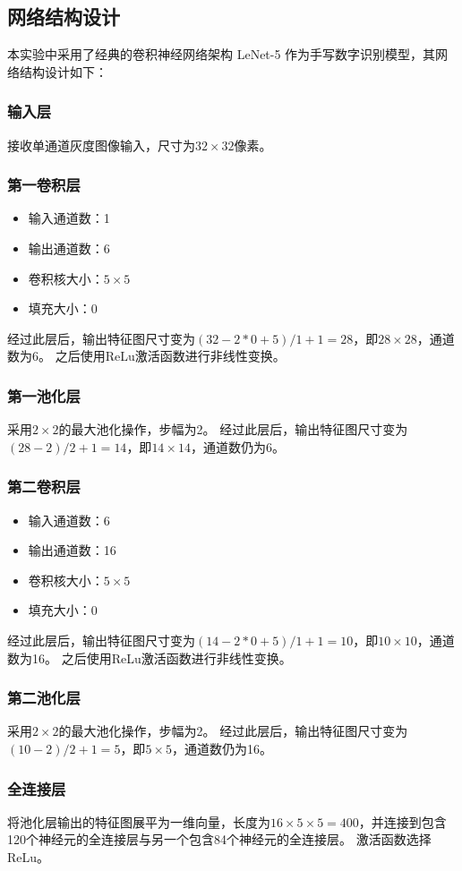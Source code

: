 \documentclass[12pt]{article}
\begin{document}
\subsection{网络结构设计}
本实验中采用了经典的卷积神经网络架构 LeNet-5 作为手写数字识别模型，其网络结构设计如下：
\subsubsection*{输入层}
接收单通道灰度图像输入，尺寸为$32 \times 32$像素。
\subsubsection*{第一卷积层}
\begin{itemize}
\item 输入通道数：1
\item 输出通道数：6
\item 卷积核大小：$5 \times 5$
\item 填充大小：0
\end{itemize}
经过此层后，输出特征图尺寸变为$(32 - 2*0 + 5) / 1 + 1 = 28$，即$28 \times 28$，通道数为6。
之后使用ReLu激活函数进行非线性变换。
\subsubsection*{第一池化层}
采用$2 \times 2$的最大池化操作，步幅为2。
经过此层后，输出特征图尺寸变为$(28 - 2) / 2 + 1 = 14$，即$14 \times 14$，通道数仍为6。
\subsubsection*{第二卷积层}
\begin{itemize}
\item 输入通道数：6
\item 输出通道数：16
\item 卷积核大小：$5 \times 5$
\item 填充大小：0
\end{itemize}
经过此层后，输出特征图尺寸变为$(14 - 2*0 + 5) / 1 + 1 = 10$，即$10 \times 10$，通道数为16。
之后使用ReLu激活函数进行非线性变换。
\subsubsection*{第二池化层}
采用$2 \times 2$的最大池化操作，步幅为2。
经过此层后，输出特征图尺寸变为$(10 - 2) / 2 + 1 = 5$，即$5 \times 5$，通道数仍为16。
\subsubsection*{全连接层}
将池化层输出的特征图展平为一维向量，长度为$16 \times 5 \times 5 = 400$，并连接到包含120个神经元的全连接层与另一个包含84个神经元的全连接层。
激活函数选择ReLu。
\end{document}
